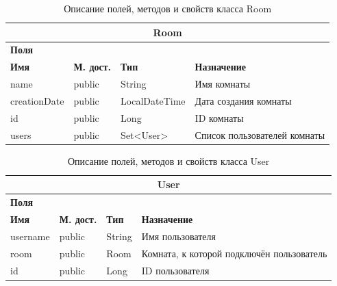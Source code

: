 \documentclass{../includes/TechDoc}
\begin{document}
    \begin{table}[h]
        \caption{\label{tab:class-WebsocketEventListener-table}Описание полей, методов и свойств класса Room}
        \begin{tabularx}{\textwidth}{|l|l|l|X|}
            \hline
            \multicolumn{4}{|c|}{Room} \\ \hline
            \multicolumn{4}{|l|}{\textbf{Поля}} \\ \hline
            \textbf{Имя} & \textbf{М. дост.} & \textbf{Тип}  & \textbf{Назначение}          \\ \hline
            name         & public            & String        & Имя комнаты                  \\ \hline
            creationDate & public            & LocalDateTime & Дата создания комнаты        \\ \hline
            id           & public            & Long          & ID комнаты                   \\ \hline
            users        & public            & Set<User>     & Список пользователей комнаты \\ \hline
        \end{tabularx}
    \end{table}

    \begin{table}[h]
        \caption{\label{tab:class-WebsocketEventListener-table}Описание полей, методов и свойств класса User}
        \begin{tabularx}{\textwidth}{|l|l|l|X|}
            \hline
            \multicolumn{4}{|c|}{User} \\ \hline
            \multicolumn{4}{|l|}{\textbf{Поля}} \\ \hline
            \textbf{Имя} & \textbf{М. дост.} & \textbf{Тип} & \textbf{Назначение}                       \\ \hline
            username     & public            & String       & Имя пользователя                          \\ \hline
            room         & public            & Room         & Комната, к которой подключён пользователь \\ \hline
            id           & public            & Long         & ID пользователя                           \\ \hline
        \end{tabularx}
    \end{table}
\end{document}
